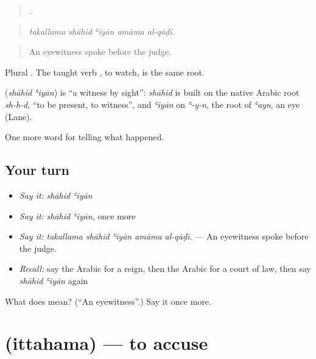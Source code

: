 \begin{quote}
    .
\end{quote}

\begin{quote}
\emph{takallama shāhid ʿiyān amāma al-qāḍī.}
\end{quote}

\begin{quote}
An eyewitness spoke before the judge.
\end{quote}

Plural  . The taught verb , to watch, is the same root.

\begin{cousinweb}
\textbf{ } (\emph{shāhid ʿiyān}) is \textquotedblleft{}a witness by sight\textquotedblright{}: \emph{shāhid} is built on the native Arabic root \emph{sh-h-d}, \textquotedblleft{}to be present, to witness\textquotedblright{}, and \emph{ʿiyān} on \emph{ʿ-y-n}, the root of \emph{ʿayn}, an eye (Lane).
\end{cousinweb}

\begin{grammarlens}[title={What you've built}]
One more word for telling what happened.
\end{grammarlens}

\subsection*{Your turn}
\begin{itemize}
\raggedright
  \item \emph{Say it:} \emph{shāhid ʿiyān}
  \item \emph{Say it:} \emph{shāhid ʿiyān}, once more
  \item \emph{Say it:} \emph{takallama shāhid ʿiyān amāma al-qāḍī.} — An eyewitness spoke before the judge.
  \item \emph{Recall:} say the Arabic for a reign, then the Arabic for a court of law, then say \emph{shāhid ʿiyān} again
\end{itemize}

\begin{tcolorbox}[breakable,colback=teal!4,colframe=teal!35!black,title={Before you move on}]
What does   mean? (\textquotedblleft{}An eyewitness\textquotedblright{}.) Say it once more.
\end{tcolorbox}
\section[\texorpdfstring{\ar{اتهم} (ittahama)}{اتهم (ittahama)}]{ (ittahama) — to accuse}

